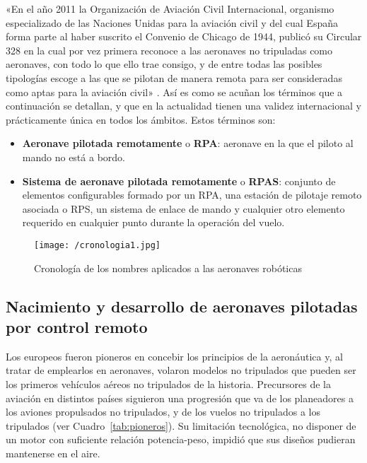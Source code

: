 «En el año 2011 la Organización de Aviación Civil Internacional, organismo especializado de las Naciones 
Unidas para la aviación civil y del cual España forma parte al haber suscrito el Convenio de Chicago de 1944, 
publicó su Circular 328 en la cual por vez primera reconoce a las aeronaves no tripuladas como aeronaves, 
con todo lo que ello trae consigo, y de entre todas las posibles tipologías escoge a las que se pilotan de manera 
remota para ser consideradas como aptas para la aviación civil» \cite{dron1}. Así es como se acuñan los términos que a continuación se detallan, y que en la actualidad tienen una validez internacional y prácticamente única en todos los ámbitos. Estos términos son:

\begin{itemize}
\item \textbf{Aeronave pilotada remotamente} o \textbf{\acs{RPA}}: aeronave en la que el piloto al mando no está a bordo.
\item \textbf{Sistema de aeronave pilotada remotamente} o \textbf{\acs{RPAS}}: conjunto de elementos configurables formado por un \acs{RPA}, 
una estación de pilotaje remoto asociada o \acs{RPS}, un sistema de enlace de mando y cualquier otro elemento requerido en cualquier 
punto durante la operación del vuelo.
\end{itemize}

\begin{figure}[!h]
\begin{center}
\texttt{[image: /cronologia1.jpg]}
\caption[Cronología de los nombres aplicados a las aeronaves robóticas]{Cronología de los nombres aplicados a las aeronaves robóticas \footnotemark}
\label{fig:cronologia}
\end{center}
\end{figure}


\subsection{Nacimiento y desarrollo de aeronaves pilotadas por control remoto}
\label{sec:historia}

Los europeos fueron pioneros en concebir los principios de la aeronáutica y, al 
tratar de emplearlos en aeronaves, volaron modelos no tripulados que pueden ser los primeros vehículos 
aéreos no tripulados de la historia. Precursores de la aviación en distintos países siguieron una progresión que va de los
planeadores a los aviones propulsados no tripulados, y de los vuelos no tripulados a los
tripulados (ver Cuadro~\ref{tab:pioneros}). Su limitación tecnológica, no disponer de un motor con suficiente relación potencia-peso, 
impidió que sus diseños pudieran mantenerse en el aire.

